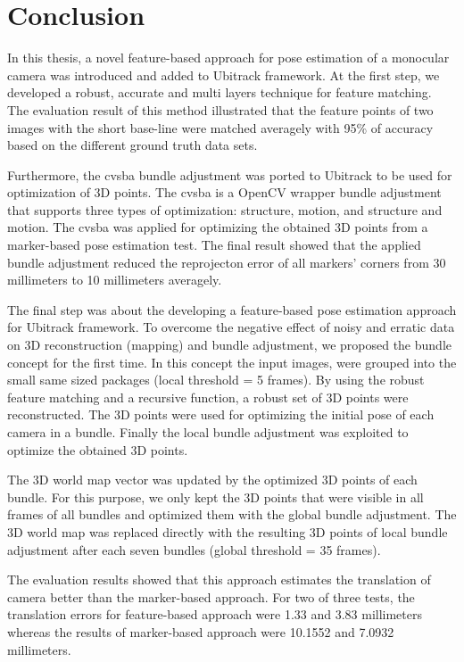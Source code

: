 \chapter{Conclusion}\label{chapter:conclusion}

In this thesis, a novel feature-based approach for pose estimation of a monocular camera was introduced and added to Ubitrack framework. At the first step, we developed a robust, accurate and multi layers technique for feature matching. The evaluation result of this method illustrated that the feature points of two images with the short base-line were matched averagely with 95\% of accuracy based on the different ground truth data sets.

Furthermore, the cvsba bundle adjustment was ported to Ubitrack to be used for optimization of 3D points. The cvsba is a OpenCV wrapper bundle adjustment that supports three types of optimization: structure, motion, and structure and motion. The cvsba was applied for optimizing the obtained 3D points from a marker-based pose estimation test. The final result showed that the applied bundle adjustment reduced the reprojecton error of all markers' corners from 30 millimeters to 10 millimeters averagely. 

The final step was about the developing a feature-based pose estimation approach for Ubitrack framework. To overcome the negative effect of noisy and erratic data on 3D reconstruction (mapping) and bundle adjustment, we proposed the bundle concept for the first time. In this concept the input images, were grouped into the small same sized packages (local threshold = 5 frames). By using the robust feature matching and a recursive function, a robust set of 3D points were reconstructed. The 3D points were used for optimizing the initial pose of each camera in a bundle. Finally the local bundle adjustment was exploited to optimize the obtained 3D points. 

The 3D world map vector was updated by the optimized 3D points of each bundle. For this purpose, we only kept the 3D points that were visible in all frames of all bundles and optimized them with the global bundle adjustment. The 3D world map was replaced directly with the resulting 3D points of local bundle adjustment after each seven bundles (global threshold = 35 frames).

The evaluation results showed that this approach estimates the translation of camera better than the marker-based approach. For two of three tests, the translation errors for feature-based approach were 1.33 and 3.83 millimeters whereas the results of marker-based approach were 10.1552 and 7.0932 millimeters. 

